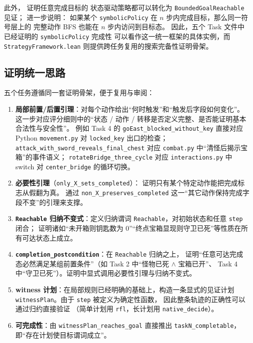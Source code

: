 \documentclass[12pt,a4paper]{ctexart}
\begin{document}
此外， 证明任意完成目标的
状态驱动策略都可以转化为 \texttt{BoundedGoalReachable} 见证；
 进一步说明：
如果某个 \texttt{symbolicPolicy} 在 \(n\) 步内完成目标，那么同一符号层上的
完整动作 BFS 也能在 \(n\) 步内访问到目标态。
因此，五个 Task 文件中已经证明的 \texttt{symbolicPolicy} 完成性
可以看作这一统一框架的具体实例，而 \texttt{StrategyFramework.lean}
则提供跨任务复用的搜索完备性证明骨架。

\subsection{证明统一思路}

五个任务遵循同一套证明骨架，便于复用与审阅：

\begin{enumerate}[leftmargin=2em]
  \item \textbf{局部前置/后置引理}：对每个动作给出“何时触发”和“触发后字段如何变化”。
  这一步对应评分细则中的“状态 / 动作 / 转移是否定义完整、是否能证明基本合法性与安全性”。
  例如 Task 4 的 \texttt{goEast\_blocked\_without\_key} 直接对应 Python
  \texttt{movement.py} 对 \texttt{locked\_key} 出口的检查；
  \texttt{attack\_with\_sword\_reveals\_final\_chest} 对应
  \texttt{combat.py} 中“清怪后揭示宝箱”的事件语义；
  \texttt{rotateBridge\_three\_cycle} 对应 \texttt{interactions.py}
  中 switch 对 \texttt{center\_bridge} 的循环切换。
  \item \textbf{必要性引理}（\texttt{only\_X\_sets\_completed}）：
  证明只有某个特定动作能把完成标志从假翻为真。
  通过 \texttt{non\_X\_preserves\_completed} 这一“其它动作保持完成字段不变”的引理来支撑。
  \item \textbf{\texttt{Reachable} 归纳不变式}：定义归纳谓词
  \texttt{Reachable}，对初始状态和任意 \texttt{step} 闭合；
  证明诸如“未开箱则钥匙数为 0”“终点宝箱显现则守卫已死”等性质在所有可达状态上成立。
  \item \textbf{\texttt{completion\_postcondition}}：在 \texttt{Reachable} 归纳之上，
  证明“任意可达完成态必然满足某组前置条件”（如 Task 2 中“怪物已死 $\wedge$ 宝箱已开”、
  Task 4 中“守卫已死”）。证明中显式调用必要性引理与归纳不变式。
  \item \textbf{witness 计划}：在局部规则已经明确的基础上，构造一条显式的见证计划
  \texttt{witnessPlan}。由于 \texttt{step} 被定义为确定性函数，
  因此整条轨迹的正确性可以通过归约直接验证
  （简单计划用 \texttt{rfl}，长计划用 \texttt{native\_decide}）。
  \item \textbf{可完成性}：由 \texttt{witnessPlan\_reaches\_goal} 直接推出
  \texttt{taskN\_completable}，即“存在计划使目标谓词成立”。
\end{enumerate}
\end{document}
